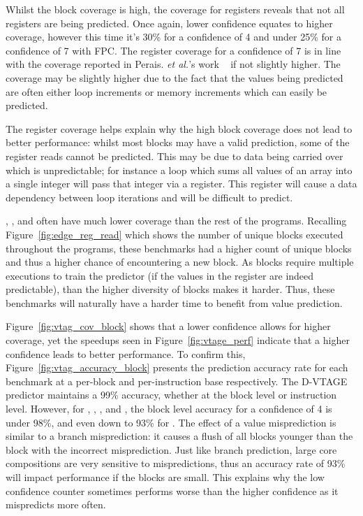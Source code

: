 Whilst the block coverage is high, the coverage for registers reveals that not all registers are being predicted.
Once again, lower confidence equates to higher coverage, however this time it's 30\% for a confidence of 4 and under 25\% for a confidence of 7 with FPC.
The register coverage for a confidence of 7 is in line with the coverage reported in Perais. {\it et al.}'s work ~\cite{peraisBeBop2015, peraisVTAGE2014} if not slightly higher.
The coverage may be slightly higher due to the fact that the values being predicted are often either loop increments or memory increments which can easily be predicted.

The register coverage helps explain why the high block coverage does not lead to better performance: whilst most blocks may have a valid prediction, some of the register reads cannot be predicted.
This may be due to data being carried over which is unpredictable; for instance a loop which sums all values of an array into a single integer will pass that integer via a register.
This register will cause a data dependency between loop iterations and will be difficult to predict.


, ,  and  often have much lower coverage than the rest of the programs.
Recalling Figure~\ref{fig:edge_reg_read} which shows the number of unique blocks executed throughout the programs, these benchmarks had a higher count of unique blocks and thus a higher chance of encountering a new block.
As blocks require multiple executions to train the predictor (if the values in the register are indeed predictable), than the higher diversity of blocks makes it harder.
Thus, these benchmarks will naturally have a harder time to benefit from value prediction.

Figure~\ref{fig:vtag_cov_block} shows that a lower confidence allows for higher coverage, yet the speedups seen in Figure~\ref{fig:vtage_perf} indicate that a higher confidence leads to better performance.
To confirm this, Figure~\ref{fig:vtag_accuracy_block} presents the prediction accuracy rate for each benchmark at a per-block and per-instruction base respectively.
The D-VTAGE predictor maintains a 99\% accuracy, whether at the block level or instruction level.
However, for , , ,  and , the block level accuracy for a confidence of 4 is under 98\%, and even down to 93\% for .
The effect of a value misprediction is similar to a branch misprediction: it causes a flush of all blocks younger than the block with the incorrect misprediction.
Just like branch prediction, large core compositions are very sensitive to mispredictions, thus an accuracy rate of 93\% will impact performance if the blocks are small.
This explains why the low confidence counter sometimes performs worse than the higher confidence as it mispredicts more often.
\vspace{-1em}

